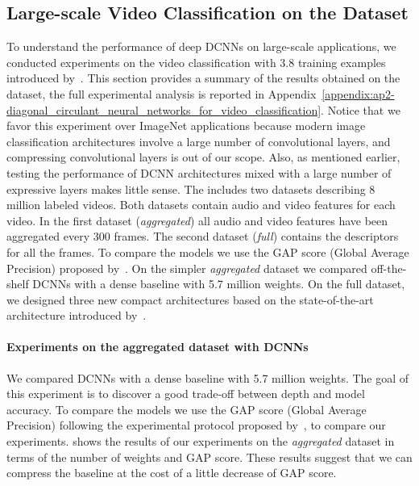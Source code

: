 \subsection{Large-scale Video Classification on the \yt Dataset}
\label{subsection:ch4-large_scale_video_classification}

To understand the performance of deep DCNNs on large-scale applications, we conducted experiments on the \yt video classification with 3.8 training examples introduced by~\citet{abu2016youtube}.
This section provides a summary of the results obtained on the \yt dataset, the full experimental analysis is reported in Appendix~\ref{appendix:ap2-diagonal_circulant_neural_networks_for_video_classification}.
Notice that we favor this experiment over ImageNet applications because modern image classification architectures involve a large number of convolutional layers, and compressing convolutional layers is out of our scope. 
Also, as mentioned earlier, testing the performance of DCNN architectures mixed with a large number of expressive layers makes little sense.
The \yt includes two datasets describing 8 million labeled videos.
Both datasets contain audio and video features for each video.
In the first dataset (\emph{aggregated}) all audio and video features have been aggregated every 300 frames.
The second dataset (\emph{full}) contains the descriptors for all the frames.
To compare the models we use the GAP score (Global Average Precision) proposed by~\citet{abu2016youtube}.
On the simpler \emph{aggregated} dataset we compared off-the-shelf DCNNs with a dense baseline with 5.7 million weights.
On the full dataset, we designed three new compact architectures based on the state-of-the-art architecture introduced by~\citet{abu2016youtube}. 

\paragraph{Experiments on the aggregated dataset with DCNNs}
We compared DCNNs with a dense baseline with 5.7 million weights.
The goal of this experiment is to discover a good trade-off between depth and model accuracy.
To compare the models we use the GAP score (Global Average Precision) following the experimental protocol proposed by~\citet{abu2016youtube}, to compare our experiments. 
 shows the results of our experiments on the \emph{aggregated} \yt dataset in terms of the number of weights and GAP score.
These results suggest that we can compress the baseline at the cost of a little decrease of GAP score.

